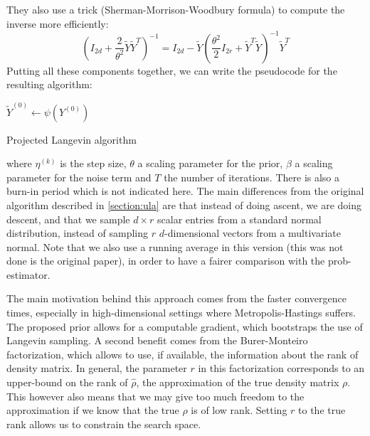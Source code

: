 \documentclass[12pt]{memoir}
\begin{document}
They also use a trick (Sherman-Morrison-Woodbury formula) to compute the inverse more efficiently:
\begin{equation}
\left( I_{2d} + \frac{2}{\theta^2} \tilde Y \tilde Y^{T} \right)^{-1} =  I_{2d} - \tilde Y \left( \frac{\theta^2}{2} I_{2r}+\tilde Y^{T} \tilde Y \right)^{-1} \tilde Y^{T}
\end{equation}
Putting all these components together, we can write the pseudocode for the resulting algorithm:\medbreak

\begin{algorithm}[H]
    \DontPrintSemicolon

    $\tilde Y^{(0)} \gets \psi(Y^{(0)})$\;
    \caption{Projected Langevin algorithm}
\end{algorithm}\medbreak
where $\eta^{(k)}$ is the step size, $\theta$ a scaling parameter for the prior, $\beta$ a scaling parameter for the noise term and $T$ the number of iterations. There is also a burn-in period which is not indicated here. The main differences from the original algorithm described in \ref{section:ula} are that instead of doing ascent, we are doing descent, and that we sample $ d\times r$ scalar entries from a standard normal distribution, instead of sampling $r$ $d$-dimensional vectors from a multivariate normal. Note that we also use a running average in this version (this was not done is the original paper), in order to have a fairer comparison with the prob-estimator.\medbreak

The main motivation behind this approach comes from the faster convergence times, especially in high-dimensional settings where Metropolis-Hastings suffers. The proposed prior allows for a computable gradient, which bootstraps the use of Langevin sampling. A second benefit comes from the Burer-Monteiro factorization, which allows to use, if available, the information about the rank of density matrix. In general, the parameter $r$ in this factorization corresponds to an upper-bound on the rank of $\hat \rho$, the approximation of the true density matrix $\rho$. This however also means that we may give too much freedom to the approximation if we know that the true $\rho$ is of low rank. Setting $r$ to the true rank allows us to constrain the search space.\medbreak
\end{document}
